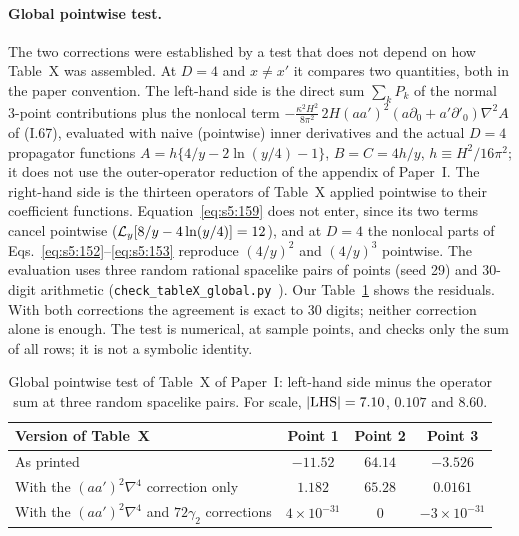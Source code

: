 \documentclass[aps,prd,onecolumn,10pt,nofootinbib,floatfix]{revtex4-2}
\newcommand{\PI}{Paper~I}
\newcommand{\eqI}[1]{(I.#1)}
\begin{document}
\paragraph*{Global pointwise test.}
The two corrections were established by a test that does not depend on how Table~X was assembled.
At $D=4$ and $x\neq x'$ it compares two quantities, both in the paper convention.
The left-hand side is the direct sum $\sum_kP_k$ of the normal 3-point contributions plus the nonlocal term $-\frac{\kappa^2H^2}{8\pi^2}\,2H(aa')^2(a\partial_0+a'\partial'_0)\nabla^2A$ of \eqI{67}, evaluated with naive (pointwise) inner derivatives and the actual $D=4$ propagator functions $A=h\{4/y-2\ln(y/4)-1\}$, $B=C=4h/y$, $h\equiv H^2/16\pi^2$; it does not use the outer-operator reduction of the appendix of \PI.
The right-hand side is the thirteen operators of Table~X applied pointwise to their coefficient functions.
Equation~\eqref{eq:s5:159} does not enter, since its two terms cancel pointwise ($\mathcal{L}_y[8/y-4\ln(y/4)]=12$), and at $D=4$ the nonlocal parts of Eqs.~\eqref{eq:s5:152}--\eqref{eq:s5:153} reproduce $(4/y)^2$ and $(4/y)^3$ pointwise.
The evaluation uses three random rational spacelike pairs of points (seed 29) and 30-digit arithmetic (\texttt{check\_tableX\_global.py}~\cite{ref:repo}).
Our Table~\ref{tab:s5:global} shows the residuals.
With both corrections the agreement is exact to 30 digits; neither correction alone is enough.
The test is numerical, at sample points, and checks only the sum of all rows; it is not a symbolic identity.

\begin{table}[tb]
\caption{Global pointwise test of Table~X of \PI: left-hand side minus the operator sum at three random spacelike pairs. For scale, $|{\rm LHS}|=7.10$, $0.107$ and $8.60$.}
\label{tab:s5:global}
\renewcommand{\arraystretch}{1.3}
\begin{ruledtabular}
\begin{tabular}{lccc}
Version of Table~X & Point 1 & Point 2 & Point 3\\
\hline
As printed & $-11.52$ & $64.14$ & $-3.526$\\
With the $(aa')^2\nabla^4$ correction only & $1.182$ & $65.28$ & $0.0161$\\
With the $(aa')^2\nabla^4$ and $72\gamma_2$ corrections & $4\times10^{-31}$ & $0$ & $-3\times10^{-31}$\\
\end{tabular}
\end{ruledtabular}
\end{table}
\end{document}
